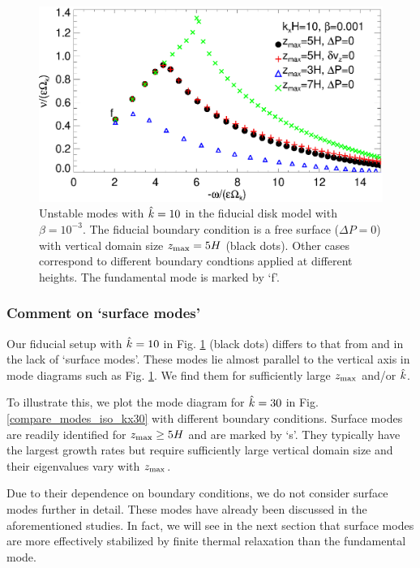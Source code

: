 \begin{figure}
  \includegraphics[width=\linewidth]{figures/compare_modes_iso_kx10.ps}
  \caption{Unstable modes with $\hat{k}=10$ in the fiducial disk model
    with $\beta=10^{-3}$. %
    The fiducial boundary condition is a free surface ($\Delta P=0$)
    with vertical domain size $z_\mathrm{max}=5H$  (black dots).  Other
    cases correspond to different boundary condtions applied at
    different heights. The fundamental mode is marked by `f'.   
    \label{compare_modes_iso_kx10} 
  }
\end{figure}

\subsubsection{Comment on `surface modes'} 
Our fiducial setup with $\hat{k}=10$ in 
Fig. \ref{compare_modes_iso_kx10} (black dots) differs to that from
\cite{nelson13} and \cite{mcnally14} in the lack of `surface modes'. 
These modes lie almost parallel to the vertical axis in mode 
diagrams such as Fig. \ref{compare_modes_iso_kx10}. We find them for 
sufficiently large $z_\mathrm{max}$ and/or $\hat{k}$. %

To illustrate this, we plot the mode diagram for $\hat{k}=30$ in  
Fig. \ref{compare_modes_iso_kx30} with different boundary 
conditions. Surface modes are readily identified for 
$z_\mathrm{max}\geq 5H$ and are marked by `s'. They typically
have the largest growth rates but require sufficiently large vertical
domain size and their eigenvalues vary with $z_\mathrm{max}$.  

Due to their dependence on boundary conditions, we 
do not consider surface modes further in detail. These modes have
already been discussed in the aforementioned studies. In fact, we will
see in the next section that surface modes are more effectively
stabilized by finite thermal relaxation than the fundamental mode. %

